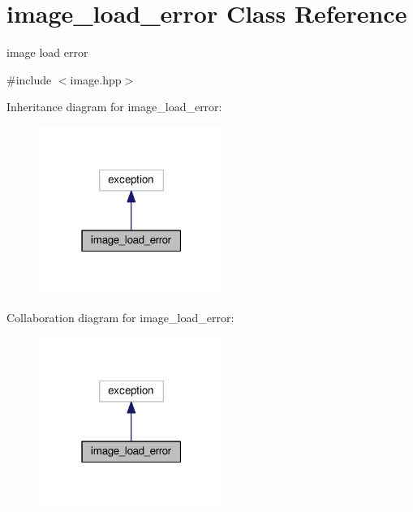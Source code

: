 \hypertarget{classimage__load__error}{}\section{image\+\_\+load\+\_\+error Class Reference}
\label{classimage__load__error}


image load error  




{\ttfamily \#include $<$image.\+hpp$>$}



Inheritance diagram for image\+\_\+load\+\_\+error\+:\nopagebreak
\begin{figure}[H]
\begin{center}
\leavevmode
\includegraphics[width=171pt]{classimage__load__error__inherit__graph}
\end{center}
\end{figure}


Collaboration diagram for image\+\_\+load\+\_\+error\+:\nopagebreak
\begin{figure}[H]
\begin{center}
\leavevmode
\includegraphics[width=171pt]{classimage__load__error__coll__graph}
\end{center}
\end{figure}
